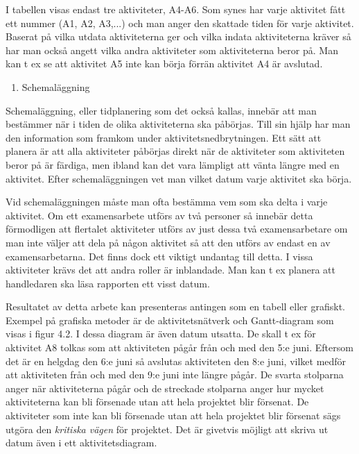 I tabellen visas endast tre aktiviteter, A4-A6. Som synes har varje
aktivitet fått ett nummer (A1, A2, A3,...) och man anger den skattade
tiden för varje aktivitet. Baserat på vilka utdata aktiviteterna ger och
vilka indata aktiviteterna kräver så har man också angett vilka andra
aktiviteter som aktiviteterna beror på. Man kan t ex se att aktivitet A5
inte kan börja förrän aktivitet A4 är avslutad.

\begin{enumerate}
\def\labelenumi{\arabic{enumi}.}
\item
  Schemaläggning
\end{enumerate}

Schemaläggning, eller tidplanering som det också kallas, innebär att man
bestämmer när i tiden de olika aktiviteterna ska påbörjas. Till sin
hjälp har man den information som framkom under aktivitetsnedbrytningen.
Ett sätt att planera är att alla aktiviteter påbörjas direkt när de
aktiviteter som aktiviteten beror på är färdiga, men ibland kan det vara
lämpligt att vänta längre med en aktivitet. Efter schemaläggningen vet
man vilket datum varje aktivitet ska börja.

Vid schemaläggningen måste man ofta bestämma vem som ska delta i varje
aktivitet. Om ett examensarbete utförs av två personer så innebär detta
förmodligen att flertalet aktiviteter utförs av just dessa två
examensarbetare om man inte väljer att dela på någon aktivitet så att
den utförs av endast en av examensarbetarna. Det finns dock ett viktigt
undantag till detta. I vissa aktiviteter krävs det att andra roller är
inblandade. Man kan t ex planera att handledaren ska läsa rapporten ett
visst datum.

Resultatet av detta arbete kan presenteras antingen som en tabell eller
grafiskt. Exempel på grafiska metoder är de aktivitetsnätverk och
Gantt-diagram som visas i figur 4.2. I dessa diagram är även datum
utsatta. De skall t ex för aktivitet A8 tolkas som att aktiviteten pågår
från och med den 5:e juni. Eftersom det är en helgdag den 6:e juni så
avslutas aktiviteten den 8:e juni, vilket medför att aktiviteten från
och med den 9:e juni inte längre pågår. De svarta stolparna anger när
aktiviteterna pågår och de streckade stolparna anger hur mycket
aktiviteterna kan bli försenade utan att hela projektet blir försenat.
De aktiviteter som inte kan bli försenade utan att hela projektet blir
försenat sägs utgöra den \emph{kritiska vägen} för projektet. Det är
givetvis möjligt att skriva ut datum även i ett aktivitetsdiagram.

